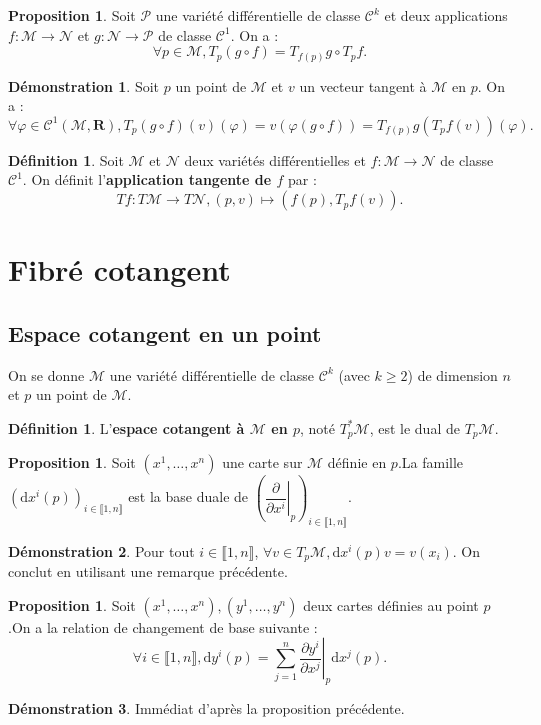 \documentclass[12pt,a4paper]{article}
\theoremstyle{definition}
\newtheorem{prop}[thm]{Proposition}
\newtheorem{defn}[thm]{Définition}
\newtheorem*{dem}{Démonstration}
\begin{document}
\begin{prop}
Soit $\mathcal{P}$ une variété différentielle de classe $\mathcal{C}^k$ et deux applications $f:\mathcal{M}\to\mathcal{N}$ et $g:\mathcal{N}\to\mathcal{P}$ de classe $\mathcal{C}^1$. On a :
$$
\forall p\in\mathcal{M},T_p(g\circ f)=T_{f(p)}g\circ T_pf.
$$
\end{prop}
\begin{dem}
Soit $p$ un point de $\mathcal{M}$ et $v$ un vecteur tangent à $\mathcal{M}$ en $p$. On a :
$$
\forall \varphi\in\mathcal{C}^1(\mathcal{M},\mathbf{R}),T_p(g\circ f)(v)(\varphi)=v(\varphi(g\circ f))=T_{f(p)}g(T_pf(v))(\varphi).
$$
\end{dem}
\begin{defn}
Soit $\mathcal{M}$ et $\mathcal{N}$ deux variétés différentielles et $f:\mathcal{M}\to\mathcal{N}$ de classe $\mathcal{C}^1$. On définit l'\textbf{application tangente de $f$} par :
$$Tf:T\mathcal{M}\to T\mathcal{N},(p,v)\mapsto (f(p),T_pf(v)).$$
\end{defn}
\newpage
\section{Fibré cotangent}
\subsection{Espace cotangent en un point}
On se donne $\mathcal{M}$ une variété différentielle de classe $\mathcal{C}^k$ (avec $k\geqslant 2$) de dimension $n$ et $p$ un point de $\mathcal{M}$.
\begin{defn}
L'\textbf{espace cotangent à $\mathcal{M}$ en $p$}, noté $T_p^*\mathcal{M}$, est le dual de $T_p\mathcal{M}$.
\end{defn}
\begin{prop}
Soit $(x^1,\ldots,x^n)$ une carte sur $\mathcal{M}$ définie en $p$.\newline La famille $\left(\mathrm{d}x^i(p)\right)_{i\in\llbracket 1,n\rrbracket}$ est la base duale de $\left(\left.\dfrac{\partial}{\partial x^i}\right|_p\right)_{i\in\llbracket 1,n\rrbracket}$.
\end{prop}
\begin{dem}
Pour tout $i\in\llbracket 1,n\rrbracket$, $\forall v\in T_p\mathcal{M},\mathrm{d}x^i(p)v=v(x_i)$. On conclut en utilisant une remarque précédente.
\end{dem}
\begin{prop}
Soit $(x^1,\ldots,x^n),(y^1,\ldots,y^n)$ deux cartes définies au point $p$.\newline On a la relation de changement de base suivante :
$$
\forall i\in\llbracket 1,n\rrbracket, \mathrm{d}y^i(p)=\sum\limits_{j=1}^n\left.\dfrac{\partial y^i}{\partial x^j}\right|_p\mathrm{d}x^j(p).
$$
\end{prop}
\begin{dem}
Immédiat d'après la proposition précédente.
\end{dem}
\newpage
\end{document}
